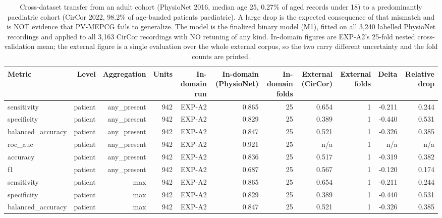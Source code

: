 \begin{table}[htbp]
  \centering
  \caption{Cross-dataset transfer from an adult cohort (PhysioNet 2016, median age 25, 0.27\% of aged records under 18) to a predominantly paediatric cohort (CirCor 2022, 98.2\% of age-banded patients paediatric). A large drop is the expected consequence of that mismatch and is NOT evidence that PV-MEPCG fails to generalize. The model is the finalized binary model (M1), fitted on all 3,240 labelled PhysioNet recordings and applied to all 3,163 CirCor recordings with NO retuning of any kind. In-domain figures are EXP-A2's 25-fold nested cross-validation mean; the external figure is a single evaluation over the whole external corpus, so the two carry different uncertainty and the fold counts are printed.}
  \label{tab:t16}
  \begin{tabular}{lrrrrrrrrrr}
    \toprule
    Metric & Level & Aggregation & Units & In-domain run & In-domain (PhysioNet) & In-domain folds & External (CirCor) & External folds & Delta & Relative drop \\
    \midrule
    sensitivity & patient & any\_present & 942 & EXP-A2 & 0.865 & 25 & 0.654 & 1 & -0.211 & 0.244 \\
    specificity & patient & any\_present & 942 & EXP-A2 & 0.829 & 25 & 0.389 & 1 & -0.440 & 0.531 \\
    balanced\_accuracy & patient & any\_present & 942 & EXP-A2 & 0.847 & 25 & 0.521 & 1 & -0.326 & 0.385 \\
    roc\_auc & patient & any\_present & 942 & EXP-A2 & 0.921 & 25 & n/a & 1 & n/a & n/a \\
    accuracy & patient & any\_present & 942 & EXP-A2 & 0.836 & 25 & 0.517 & 1 & -0.319 & 0.382 \\
    f1 & patient & any\_present & 942 & EXP-A2 & 0.687 & 25 & 0.567 & 1 & -0.120 & 0.174 \\
    sensitivity & patient & max & 942 & EXP-A2 & 0.865 & 25 & 0.654 & 1 & -0.211 & 0.244 \\
    specificity & patient & max & 942 & EXP-A2 & 0.829 & 25 & 0.389 & 1 & -0.440 & 0.531 \\
    balanced\_accuracy & patient & max & 942 & EXP-A2 & 0.847 & 25 & 0.521 & 1 & -0.326 & 0.385 \\

\end{tabular}
\end{table}
